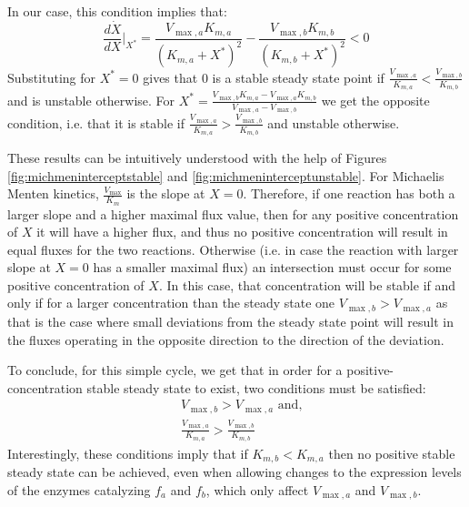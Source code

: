 \documentclass[a4page,notitlepage]{article}
\begin{document}
    In our case, this condition implies that:
    \begin{equation*}
      \frac{d\dot X}{dX}\Big\vert_{X^*} = \frac{V_{\max,a}K_{m,a}}{(K_{m,a}+X^*)^2}-\frac{V_{\max,b}K_{m,b}}{(K_{m,b}+X^*)^2}<0
    \end{equation*}
    Substituting for $X^*=0$ gives that $0$ is a stable steady state point if $\frac{V_{\max,a}}{K_{m,a}}<\frac{V_{\max,b}}{K_{m,b}}$ and is unstable otherwise.
    For $X^*=\frac{V_{\max,b}K_{m,a}-V_{\max,a}K_{m,b}}{V_{\max,a}-V_{\max,b}}$ we get the opposite condition, i.e. that it is stable if $\frac{V_{\max,a}}{K_{m,a}}>\frac{V_{\max,b}}{K_{m,b}}$ and unstable otherwise.
    
    These results can be intuitively understood with the help of Figures \ref{fig:michmeninterceptstable} and \ref{fig:michmeninterceptunstable}.
    For Michaelis Menten kinetics, $\frac{V_{\max}}{K_m}$ is the slope at $X=0$.
    Therefore, if one reaction has both a larger slope and a higher maximal flux value, then for any positive concentration of $X$ it will have a higher flux, and thus no positive concentration will result in equal fluxes for the two reactions.
    Otherwise (i.e. in case the reaction with larger slope at $X=0$ has a smaller maximal flux) an intersection must occur for some positive concentration of $X$.
    In this case, that concentration will be stable if and only if for a larger concentration than the steady state one $V_{\max,b}>V_{\max,a}$ as that is the case where small deviations from the steady state point will result in the fluxes operating in the opposite direction to the direction of the deviation.

    To conclude, for this simple cycle, we get that in order for a positive-concentration stable steady state to exist, two conditions must be satisfied:
    $$
    \begin{aligned}
      & V_{\max,b}>V_{\max,a} \text{ and,}\\
      & \frac{V_{\max,a}}{K_{m,a}}>\frac{V_{\max,b}}{K_{m,b}}
    \end{aligned}
    $$
    Interestingly, these conditions imply that if $K_{m,b}<K_{m,a}$ then no positive stable steady state can be achieved, even when allowing changes to the expression levels of the enzymes catalyzing $f_a$ and $f_b$, which only affect $V_{\max,a}$ and $V_{\max,b}$.
    
\end{document}
